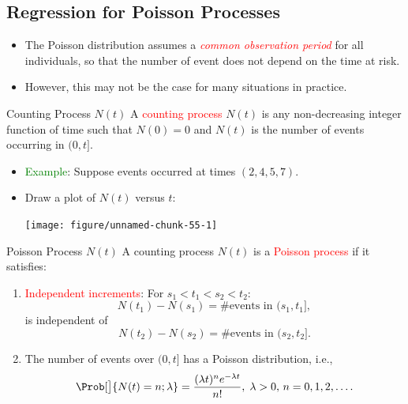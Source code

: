 \documentclass{article}\usepackage[]{graphicx}\usepackage[svgnames]{xcolor}
\newenvironment{knitrout}{}{} %
\begin{document}
\subsection*{Regression for Poisson Processes}
\begin{itemize}
      \item The Poisson distribution assumes a \textcolor{Red}{\emph{common observation period}} for all individuals,
            so that the number of event does not depend on the time at risk.
      \item However, this may not be the case for many situations in practice.
\end{itemize}
\begin{Regular}{Counting Process $ N(t) $}
      A \textcolor{Red}{counting process} $ N(t) $ is any non-decreasing integer function of time such that
      $ N(0)=0 $ and $ N(t) $ is the number of events occurring in $ (0,t] $.
\end{Regular}
\begin{itemize}
      \item \textcolor{Green}{Example}: Suppose events occurred at times $ (2,4,5,7) $.
      \item Draw a plot of $ N(t) $ versus $ t $:
\begin{knitrout}
\color{fgcolor}

{\centering \texttt{[image: figure/unnamed-chunk-55-1]} 

}


\end{knitrout}
\end{itemize}
\begin{Regular}{Poisson Process $ N(t) $}
      A counting process $ N(t) $ is a \textcolor{Red}{Poisson process} if it satisfies:
      \begin{enumerate}[1.]
            \item \textcolor{Red}{Independent increments}: For $ s_1<t_1<s_2<t_2 $:
                  \[ N(t_1)-N(s_1)=\text{\# events in $(s_1,t_1]$}, \]
                  is independent of
                  \[ N(t_2)-N(s_2)=\text{\# events in $(s_2,t_2]$}. \]
            \item The number of events over $ (0,t] $ has a Poisson distribution, i.e.,
                  \[ \Prob[\big]{N(t)=n;\lambda}=\frac{(\lambda t)^n e^{-\lambda t}}{n!},\; \lambda>0,\, n=0,1,2,\ldots.  \]
      \end{enumerate}
\end{Regular}
\end{document}
